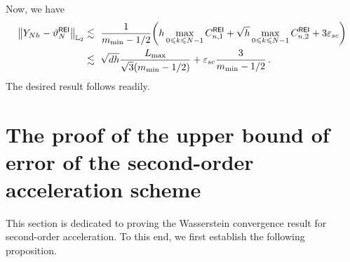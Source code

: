 Now, we have
\begin{align*}
    \l|Y_{Nh}-\vartheta_N^{\sf REI}\r|_{\Ltwo}
    &\lesssim \,\,\dfrac{1}{m_{\min}-1/2}\left(h\max_{0\leqslant k\leqslant N-1}C_{n,1}^{\sf REI}+\sqrt{h}\max_{0\leqslant k\leqslant N-1}C_{n,2}^{\sf REI}+3\varepsilon_{sc}\right)\\
    &\lesssim\,\,\sqrt{dh}\dfrac{L_{\max}}{\sqrt{3}(m_{\min}-1/2)}+\varepsilon_{sc}\dfrac{3}{m_{\min}-1/2}\,.
\end{align*}
The desired result follows readily.

\section{The proof of the upper bound of error of the second-order acceleration scheme}
This section is dedicated to proving the Wasserstein convergence result for second-order acceleration. To this end, we first establish the following proposition.
